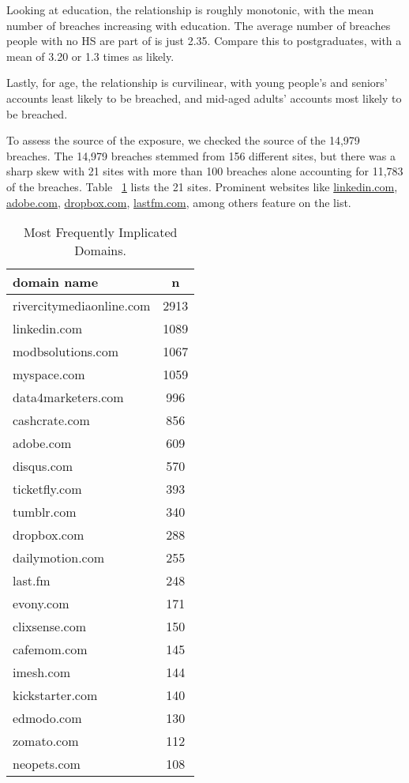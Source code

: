 \documentclass[12pt, letterpaper]{article}
\begin{document}
Looking at education, the relationship is roughly monotonic, with the mean number of breaches increasing with education. The average number of breaches people with no HS are part of is just 2.35. Compare this to postgraduates, with a mean of 3.20 or 1.3 times as likely.

Lastly, for age, the relationship is curvilinear, with young people's and seniors' accounts least likely to be breached, and mid-aged adults' accounts most likely to be breached.

To assess the source of the exposure, we checked the source of the 14,979 breaches. The 14,979 breaches stemmed from 156 different sites, but there was a sharp skew with 21 sites with more than 100 breaches alone accounting for 11,783 of the breaches. Table ~\ref{table:domain_dat} lists the 21 sites. Prominent websites like \url{linkedin.com}, \url{adobe.com}, \url{dropbox.com}, \url{lastfm.com}, among others feature on the list. 

\begin{table}[h!]
\centering
\caption{Most Frequently Implicated Domains.}
\begin{tabular}{ l c }
\hline    
domain name & n \\
\hline
rivercitymediaonline.com &   2913 \\
linkedin.com             &  1089 \\
modbsolutions.com        &   1067\\
myspace.com              &   1059\\
data4marketers.com       &    996\\
cashcrate.com            &    856\\
adobe.com                &    609\\
disqus.com               &    570\\
ticketfly.com            &    393\\
tumblr.com               &    340\\
dropbox.com              &    288\\
dailymotion.com          &    255\\
last.fm                  &    248\\
evony.com                &    171\\
clixsense.com            &    150\\
cafemom.com              &    145\\
imesh.com                &    144\\
kickstarter.com          &    140\\
edmodo.com               &    130\\
zomato.com               &    112\\
neopets.com              &    108\\
\hline
\end{tabular}
\label{table:domain_dat}
\end{table}
\end{document}
